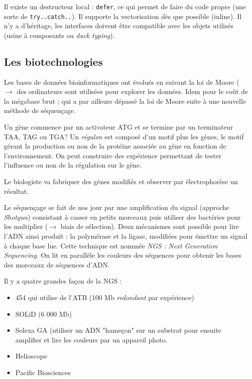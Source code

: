 \documentclass{article}
\begin{document}
Il existe un destructeur local : \texttt{defer}, ce qui permet de faire du code propre (une sorte de \texttt{try..catch..}). Il supporte la vectorisation dès que possible (inline). Il n'y a d'héritage, les interfaces doivent être compatible avec les objets utilisés (usine à composants ou \emph{duck typing}).

\subsection{Les biotechnologies}
Les bases de données bioinformatiques ont évolués en suivant la loi de Moore ($\to$ des ordinateurs sont utilisées pour explorer les données. Idem pour le coût de la mégabase brut ; qui a par ailleurs dépassé la loi de Moore suite à une nouvelle méthode de séquençage. 

Un gène commence par un activateur ATG et se termine par un terminateur TAA, TAG ou TGA? Un \emph{régulon} est composé d'un motif plus les gènes, le motif gérant la production ou non de la protéine associée au gène en fonction de l'environnement. On peut construire des expérience permettant de tester l'influence ou non de la régulation sur le gène.

Le biologiste va fabriquer des gènes modifiés et observer par électrophorèse un résultat.

Le séquençage se fait de nos jour par une amplification du signal (approche \emph{Shotgun}) consistant à casser en petits morceaux puis utiliser des bactéries pour les multiplier ($\to$ biais de sélection). Deux mécanismes sont possible pour lire l'ADN ainsi produit : la polymérase et la ligase, modifiées pour émettre un signal à chaque base lue. Cette technique est nommée \emph{NGS : Next Generation Sequencing}. On lit en parallèle les couleurs des séquences pour obtenir les bases des morceaux de séquences d'ADN. 

Il y a quatre grandes façon de la NGS : 

\begin{itemize}
\item 454 qui utilise de l'ATB (100 Mb \emph{redondant} par expérience)
\item SOLiD (6 000 Mb)
\item Solexa GA (utiliser un ADN "hameçon" sur un substrat pour ensuite amplifier et lire les couleurs par un appareil photo.
\item Helioscope
\item Pacific Biosciences
\end{itemize}
\end{document}
